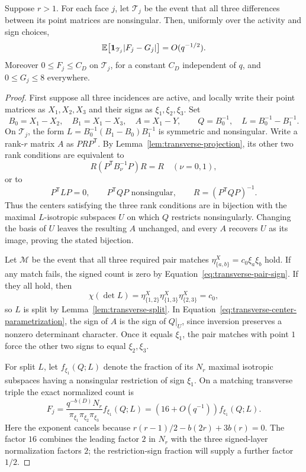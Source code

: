 \begin{lemma}
\label{lem:local-transverse}
Suppose $r>1$. For each face $j$, let $\mathcal T_j$ be the event that
all three differences between its point matrices are nonsingular.
Then, uniformly over the activity and sign choices,
\begin{equation}
\label{eq:transverse-local-l1}
 \mathbb E\bigl[\mathbf 1_{\mathcal T_j}|F_j-G_j|\bigr]=O(q^{-1/2}).
\end{equation}
Moreover $0\leq F_j\leq C_D$ on $\mathcal T_j$, for a constant $C_D$
independent of $q$, and $0\leq G_j\leq8$ everywhere.
\end{lemma}

\begin{proof}
First suppose all three incidences are active, and locally write their
point matrices as $X_1,X_2,X_3$ and their signs as $\xi_1,\xi_2,\xi_3$.
Set
\[
 B_0=X_1-X_2,\quad B_1=X_1-X_3,\quad A=X_1-Y,
 \qquad Q=B_0^{-1},\quad L=B_0^{-1}-B_1^{-1}.
\]
On $\mathcal T_j$, the form
$L=B_0^{-1}(B_1-B_0)B_1^{-1}$ is symmetric and nonsingular. Write a
rank-$r$ matrix $A$ as $PRP^{\mathsf T}$. By
Lemma~\ref{lem:transverse-projection}, its other two rank conditions are
equivalent to
\[
 R(P^{\mathsf T}B_\nu^{-1}P)R=R\quad(\nu=0,1),
\]
or to
\begin{equation}
\label{eq:transverse-center-parametrization}
 P^{\mathsf T}LP=0,\qquad
 P^{\mathsf T}QP\text{ nonsingular},\qquad
 R=(P^{\mathsf T}QP)^{-1}.
\end{equation}
Thus the centers satisfying the three rank conditions are in bijection
with the maximal $L$-isotropic subspaces $U$ on which $Q$ restricts
nonsingularly. Changing the basis of $U$ leaves the resulting $A$
unchanged, and every $A$ recovers $U$ as its image, proving the stated
bijection.

Let $\mathcal M$ be the event that all three required pair matches
$\eta^X_{\{a,b\}}=c_0\xi_a\xi_b$ hold. If any match fails, the signed
count is zero by Equation~\eqref{eq:transverse-pair-sign}. If they all
hold, then
\[
 \chi(\det L)
 =\eta^X_{\{1,2\}}\eta^X_{\{1,3\}}\eta^X_{\{2,3\}}
 =c_0,
\]
so $L$ is split by Lemma~\ref{lem:transverse-split}. In
Equation~\eqref{eq:transverse-center-parametrization}, the sign of $A$
is the sign of $Q|_U$, since inversion preserves a nonzero determinant
character. Once it equals $\xi_1$, the pair matches with point $1$
force the other two signs to equal $\xi_2,\xi_3$.

For split $L$, let $f_{\xi_1}(Q;L)$ denote the fraction of its $N_r$
maximal isotropic subspaces having a nonsingular restriction of sign
$\xi_1$. On a matching transverse triple the exact normalized count is
\begin{equation}
\label{eq:transverse-three-normalization}
 F_j=\frac{q^{-b(D)}N_r}{\pi_{\xi_1}\pi_{\xi_2}\pi_{\xi_3}}
       f_{\xi_1}(Q;L)
     =(16+O(q^{-1}))f_{\xi_1}(Q;L).
\end{equation}
Here the exponent cancels because
$r(r-1)/2-b(2r)+3b(r)=0$. The factor $16$ combines the leading
factor $2$ in $N_r$ with the three signed-layer normalization factors
$2$; the restriction-sign fraction will supply a further factor $1/2$.


\end{proof}

